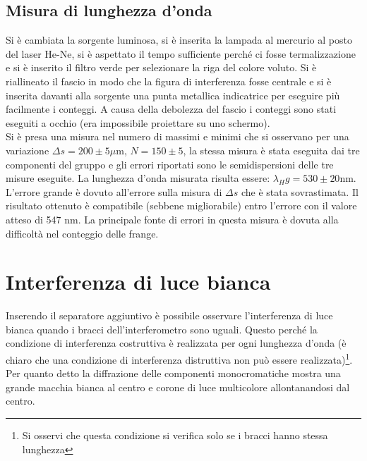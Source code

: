 \documentclass[10pt,a4paper]{article}
\begin{document}
\subsection{Misura di lunghezza d'onda}
Si è cambiata la sorgente luminosa, si è inserita la lampada al mercurio al posto del laser He-Ne, si è aspettato il tempo sufficiente perché ci fosse termalizzazione e si è inserito il filtro verde per selezionare la riga del colore voluto. Si è riallineato il fascio in modo che la figura di interferenza fosse centrale e si è inserita davanti alla sorgente una punta metallica indicatrice per eseguire più facilmente i conteggi. A causa della debolezza del fascio i conteggi sono stati eseguiti a occhio (era impossibile proiettare su uno schermo).\\
Si è presa una misura nel numero di massimi e minimi che si osservano per una variazione $\Delta s = 200 \pm 5 \mu \mbox{m}$, $N = 150 \pm 5$, la stessa misura è stata eseguita dai tre componenti del gruppo e gli errori riportati sono le semidispersioni delle tre misure eseguite. La lunghezza d'onda misurata risulta essere: $\lambda_Hg = 530 \pm 20 \mbox{nm}$. L'errore grande è dovuto all'errore sulla misura  di $\Delta s$ che è stata sovrastimata. Il risultato ottenuto è compatibile (sebbene migliorabile) entro l'errore con il valore atteso di 547 nm. La principale fonte di errori in questa misura è dovuta alla difficoltà nel conteggio delle frange.\\


\section{Interferenza di luce bianca}
Inserendo il separatore aggiuntivo è possibile osservare l'interferenza di luce bianca quando i bracci dell'interferometro sono uguali. Questo perché la condizione di interferenza costruttiva è realizzata per ogni lunghezza d'onda (è chiaro che una condizione di interferenza distruttiva non può essere realizzata)\footnote{Si osservi che questa condizione si verifica solo se i bracci hanno stessa lunghezza}. Per quanto detto la diffrazione delle componenti monocromatiche mostra una grande macchia bianca al centro e corone di luce multicolore allontanandosi dal centro. \\ 



\end{document}
